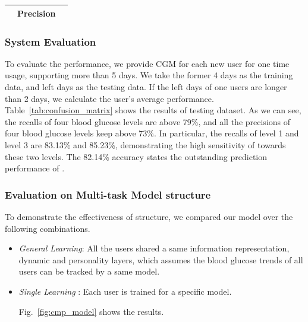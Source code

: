 \begin{table}[]
\begin{tabular}{|c|c|c|c|c|l|l|}
\multicolumn{1}{|l|}{}                                                           & \multicolumn{4}{c|}{\textbf{Precision}}                                                                                 & \multicolumn{2}{l|}{}                                                                             \\ \hline
\end{tabular}
\end{table}



\subsubsection{System Evaluation}

To evaluate the \sysname performance, we provide CGM for each new user for one time usage, supporting more than 5 days. We take the former 4 days as the training data, and left days as the testing data. If the left days of one users are longer than 2 days, we calculate the user's average performance. Table~\ref{tab:confusion_matrix} shows the results of testing dataset. As we can see,  the recalls of four blood glucose levels are above 79\%, and all the precisions of four blood glucose levels keep above 73\%. In particular, the recalls of level 1 and level 3 are 83.13\% and 85.23\%, demonstrating the high sensitivity of \sysname towards these two levels. The 82.14\% accuracy states the outstanding prediction performance of \sysname.


\subsubsection{Evaluation on Multi-task Model structure}
To demonstrate the effectiveness of \modelname structure, we compared our model over the following combinations.

\begin{itemize}

  \item \emph{General Learning}:
  All the users shared a same information representation, dynamic and personality layers, which assumes the blood glucose trends of all users can be tracked by a same model.


  \item \emph{Single Learning }:
  Each user is trained for a specific model.

  Fig.~\ref{fig:cmp_model} shows the results.
\end{itemize}


